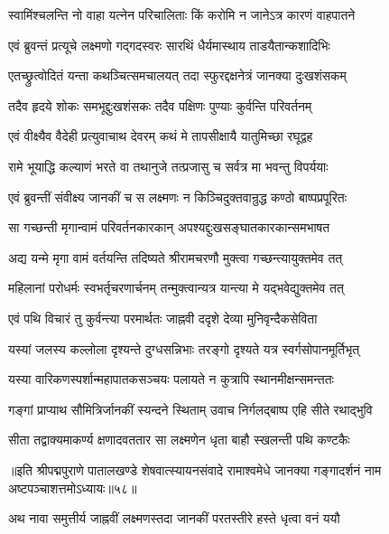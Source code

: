 
\twolineshloka
{स्वामिंश्चलन्ति नो वाहा यत्नेन परिचालिताः}
{किं करोमि न जानेऽत्र कारणं वाहपातने}%

\twolineshloka
{एवं ब्रुवन्तं प्रत्यूचे लक्ष्मणो गद्गदस्वरः}
{सारथिं धैर्यमास्थाय ताडयैतान्कशादिभिः}%

\twolineshloka
{एतच्छ्रुत्वोदितं यन्ता कथञ्चित्समचालयत्}
{तदा स्फुरद्दक्षनेत्रं जानक्या दुःखशंसकम्}%

\twolineshloka
{तदैव हृदये शोकः समभूद्दुःखशंसकः}
{तदैव पक्षिणः पुण्याः कुर्वन्ति परिवर्तनम्}%

\twolineshloka
{एवं वीक्ष्यैव वैदेही प्रत्युवाचाथ देवरम्}
{कथं मे तापसीक्षायै यातुमिच्छा रघूद्वह}%

\twolineshloka
{रामे भूयाद्धि कल्याणं भरते वा तथानुजे}
{तत्प्रजासु च सर्वत्र मा भवन्तु विपर्ययाः}%

\twolineshloka
{एवं ब्रुवन्तीं संवीक्ष्य जानकीं च स लक्ष्मणः}
{न किञ्चिदुक्तवान्रुद्ध कण्ठो बाष्पप्रपूरितः}%

\twolineshloka
{सा गच्छन्ती मृगान्वामं परिवर्तनकारकान्}
{अपश्यद्दुःखसङ्घातकारकान्समभाषत}%

\twolineshloka
{अद्य यन्मे मृगा वामं वर्तयन्ति तदिष्यते}
{श्रीरामचरणौ मुक्त्वा गच्छन्त्यायुक्तमेव तत्}%

\twolineshloka
{महिलानां परोधर्मः स्वभर्तृचरणार्चनम्}
{तन्मुक्त्वान्यत्र यान्त्या मे यद्भवेद्युक्तमेव तत्}%

\twolineshloka
{एवं पथि विचारं तु कुर्वन्त्या परमार्थतः}
{जाह्नवी ददृशे देव्या मुनिवृन्दैकसेविता}%

\twolineshloka
{यस्यां जलस्य कल्लोला दृश्यन्ते दुग्धसन्निभाः}
{तरङ्गो दृश्यते यत्र स्वर्गसोपानमूर्तिभृत्}%

\twolineshloka
{यस्या वारिकणस्पर्शान्महापातकसञ्चयः}
{पलायते न कुत्रापि स्थानमीक्षन्समन्ततः}%

\twolineshloka
{गङ्गां प्राप्याथ सौमित्रिर्जानकीं स्यन्दने स्थिताम्}
{उवाच निर्गलद्बाष्प एहि सीते रथाद्भुवि}%

\twolineshloka
{सीता तद्वाक्यमाकर्ण्य क्षणादवततार सा}
{लक्ष्मणेन धृता बाहौ स्खलन्ती पथि कण्टकैः}%

॥इति श्रीपद्मपुराणे पातालखण्डे शेषवात्स्यायनसंवादे रामाश्वमेधे जानक्या गङ्गादर्शनं नाम अष्टपञ्चाशत्तमोऽध्यायः॥५८॥



\twolineshloka
{अथ नावा समुत्तीर्य जाह्नवीं लक्ष्मणस्तदा}
{जानकीं परतस्तीरे हस्ते धृत्वा वनं ययौ}%

